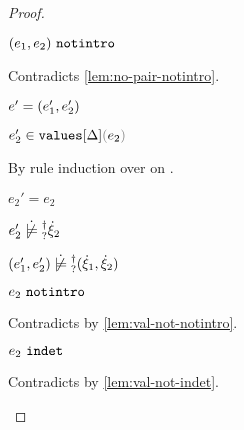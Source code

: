 \begin{proof}
\begin{byCases}
\begin{byCases}
\begin{byCases}
\begin{byCases}
\begin{byCases}
\begin{pfsteps*}
            \item $(e_1 , e_2) ~\mathtt{notintro}$ 
            \end{pfsteps*}
            Contradicts \autoref{lem:no-pair-notintro}.
            \item[\text{(\ref{rule:IVPair})}]
            \begin{pfsteps*}
            \item $e'=(e_1' , e_2')$ 
            \item $\inValues{e_2'}{\Delta}{e_2}$  
            \end{pfsteps*}
            By rule induction over  on .
            \begin{byCases}
              \item[\text{(\ref{rule:IVVal})}]
              \begin{pfsteps*}
              \item $e_2'=e_2$  
              \item $\cnotsatisfyormay{e_2'}{\hxi_2}$  
              \item $\cnotsatisfyormay{\hpair{e_1'}{e_2'}}{\cpair{\hxi_1}{\hxi_2}}$ 
              \end{pfsteps*} 
              \item[\text{(\ref{rule:IVIndet})}]
              \begin{pfsteps*}
              \item $e_2 ~\mathtt{notintro}$ 
              \end{pfsteps*} 
              Contradicts  by \autoref{lem:val-not-notintro}.
              \item[\text{(\ref{rule:IVInl}), (\ref{rule:IVInr}), (\ref{rule:IVPair})}]
              \begin{pfsteps*}
              \item $e_2 ~\mathtt{indet}$ 
              \end{pfsteps*} 
              Contradicts  by \autoref{lem:val-not-indet}.
            \end{byCases}
          \end{byCases}

\end{byCases}
\end{byCases}
\end{byCases}
\end{byCases}
\end{proof}
